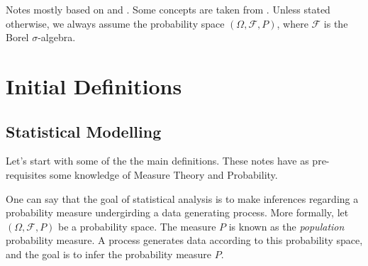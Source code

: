 Notes mostly based on \citet{keener2010theoretical} and \citet{Shao_2003_book}. Some
concepts are taken from \citet{gentle2020}.
Unless stated otherwise,
we always assume the probability space $(\Omega, \mathcal F, P)$, where
$\mathcal F$ is the Borel $\sigma$-algebra.

\section{Initial Definitions}

\subsection{Statistical Modelling}

Let's start with some of the the main definitions. These notes
have as pre-requisites some knowledge of Measure Theory and Probability.

One can say that the goal of statistical analysis is to make inferences
regarding a probability measure undergirding a data generating process.
More formally, let $(\Omega, \mathcal F, P)$ be a probability space. The measure
$P$ is known as the \textit{population} probability measure. A process
generates data according to this probability space, and the goal
is to infer the probability measure $P$.


